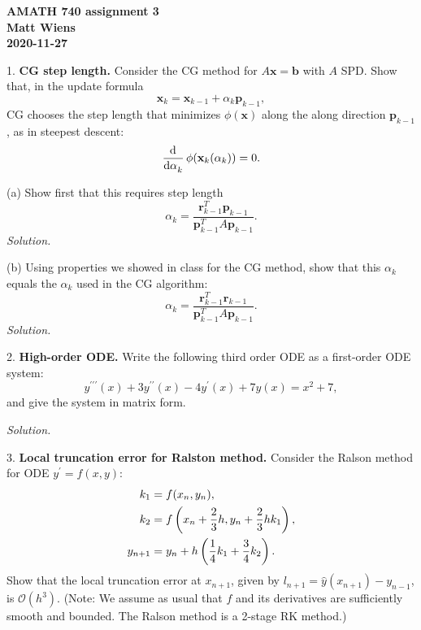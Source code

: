 \documentclass{article}
\def\*#1{\mathbf{#1}}
\newcommand{\Oh}{\mathcal{O}}
\begin{document}
\textbf{AMATH 740 assignment 3} \\
\textbf{Matt Wiens} \\
\textbf{2020-11-27}

1. \textbf{CG step length.}
Consider the CG method for $A \*x = \*b$ with $A$ SPD. Show that, in the update formula
%
\begin{equation*}
    \*x_k = \*x_{k - 1} + \alpha_k \*p_{k - 1}
    ,
\end{equation*}
%
CG chooses the step length that minimizes $\phi(\*x)$ along the along direction $\*p_{k - 1}$,
as in steepest descent:
%
\begin{equation*}
    \dod{}{\alpha_k} \phi(\*x_k(\alpha_k)) = 0.
\end{equation*}

(a) Show first that this requires step length
%
\begin{equation*}
    \alpha_k = \frac{\*r_{k - 1}^T \*p_{k - 1}}{\*p_{k - 1}^T A \*p_{k - 1}}
    .
\end{equation*}
%
\textit{Solution.}

\vspace{5mm}

(b) Using properties we showed in class for the CG method, show that this $\alpha_k$
equals the $\alpha_k$ used in the CG algorithm:
%
\begin{equation*}
    \alpha_k = \frac{\*r_{k - 1}^T \*r_{k - 1}}{\*p_{k - 1}^T A \*p_{k - 1}}
    .
\end{equation*}
%
\textit{Solution.}

\newpage

2. \textbf{High-order ODE.}
Write the following third order ODE as a first-order ODE system:
%
\begin{equation*}
    y^{\prime \prime \prime}(x) + 3 y^{\prime \prime}(x) - 4 y^\prime(x) + 7 y(x) = x^2 + 7,
\end{equation*}
%
and give the system in matrix form.

\textit{Solution.}

\newpage

3. \textbf{Local truncation error for Ralston method.}
Consider the Ralson method for ODE $y^\prime = f(x, y)$:
%
\begin{align*}
    k_1 &= f(x_n, y_n), \\
    k_2 &= f\del{x_n + \frac{2}{3} h, y_n + \frac{2}{3}h k_1}, \\
    y_{n + 1} &= y_n + h \del{\frac{1}{4} k_1 + \frac{3}{4} k_2}.
\end{align*}
%
Show that the local truncation error at $x_{n + 1}$, given by
$l_{n + 1} = \hat{y}(x_{n + 1}) - y_{n - 1}$, is $\Oh(h^3)$.
(Note: We assume as usual that $f$ and its derivatives are sufficiently smooth and bounded. The Ralson method is a 2-stage RK method.)
\end{document}
